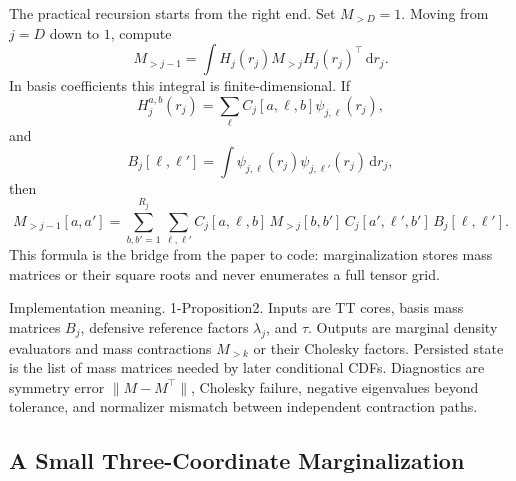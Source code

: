 \documentclass[11pt]{article}
\newcommand{\dd}{\,\mathrm d}
\begin{document}
The practical recursion starts from the right end.  Set \(M_{>D}=1\).  Moving
from \(j=D\) down to \(1\), compute
\[
    M_{>j-1}
    =
    \int H_j(r_j)M_{>j}H_j(r_j)^\top\dd r_j.
    \label{eq:p24-m5}
\]
In basis coefficients this integral is finite-dimensional.  If
\[
    H_j^{a,b}(r_j)=\sum_{\ell}C_j[a,\ell,b]\psi_{j,\ell}(r_j),
\]
and
\[
    B_j[\ell,\ell']
    =
    \int \psi_{j,\ell}(r_j)\psi_{j,\ell'}(r_j)\dd r_j,
\]
then
\[
    M_{>j-1}[a,a']
    =
    \sum_{b,b'=1}^{R_j}
    \sum_{\ell,\ell'}
    C_j[a,\ell,b]\,M_{>j}[b,b']\,C_j[a',\ell',b']\,B_j[\ell,\ell'].
    \label{eq:p24-m6}
\]
This formula is the bridge from the paper to code: marginalization stores mass
matrices or their square roots and never enumerates a full tensor grid.

Implementation meaning. 1-Proposition2.  Inputs are TT cores, basis mass
matrices \(B_j\), defensive reference factors \(\lambda_j\), and \(\tau\).
Outputs are marginal density evaluators and mass contractions \(M_{>k}\) or
their Cholesky factors.  Persisted state is the list of mass matrices needed by
later conditional CDFs.  Diagnostics are symmetry error
\(\|M-M^\top\|\), Cholesky failure, negative eigenvalues beyond tolerance, and
normalizer mismatch between independent contraction paths.

\begin{center}
\end{center}

\subsection{A Small Three-Coordinate Marginalization}
\end{document}
